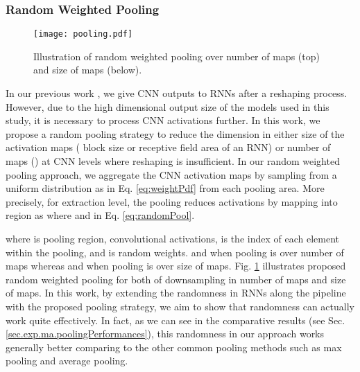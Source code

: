 \documentclass[10pt,journal,compsoc]{IEEEtran}
\begin{document}
\subsubsection{Random Weighted Pooling} \label{sec:randomPooling}
\begin{figure}[!t]
	\centering
	\texttt{[image: pooling.pdf]}
	\caption{Illustration of random weighted pooling over number of maps (top) and size of maps (below).}
	\label{fig:Pooling}
\end{figure}
In our previous work \cite{Caglayan_ECCVW_2018}, we give CNN outputs to RNNs after a reshaping process. However, due to the high dimensional output size of the models used in this study, it is necessary to process CNN activations further. In this work, we propose a random pooling strategy to reduce the dimension in either size of the activation maps ( block size or receptive field area of an RNN) or number of maps () at CNN levels where reshaping is insufficient. In our random weighted pooling approach, we aggregate the CNN activation maps by sampling from a uniform distribution as in Eq. \ref{eq:weightPdf} from each pooling area. More precisely, for  extraction level, the pooling reduces  activations by mapping into  region as  where  and  in Eq. \ref{eq:randomPool}.

where  is pooling region,  convolutional activations,  is the index of each element within the pooling, and  is random weights.  and  when pooling is over number of maps whereas  and  when pooling is over size of maps. Fig. \ref{fig:Pooling} illustrates proposed random weighted pooling for both of downsampling in number of maps and size of maps. In this work, by extending the randomness in RNNs along the pipeline with the proposed pooling strategy, we aim to show that randomness can actually work quite effectively. In fact, as we can see in the comparative results (see Sec. \ref{sec.exp.ma.poolingPerformances}), this randomness in our approach works generally better comparing to the other common pooling methods such as max pooling and average pooling.
\end{document}

